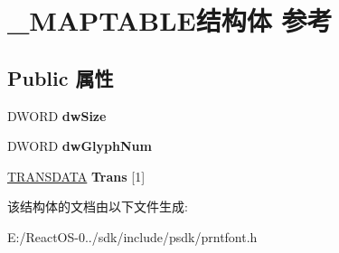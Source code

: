 \hypertarget{struct___m_a_p_t_a_b_l_e}{}\section{\+\_\+\+M\+A\+P\+T\+A\+B\+L\+E结构体 参考}
\label{struct___m_a_p_t_a_b_l_e}
\subsection*{Public 属性}
\begin{DoxyCompactItemize}
\item 
\mbox{\label{struct___m_a_p_t_a_b_l_e_a0964ee641949a1761675ea317d9630f9}} 
D\+W\+O\+RD {\bfseries dw\+Size}
\item 
\mbox{\label{struct___m_a_p_t_a_b_l_e_aeca813fa2257612330e66f1aeddbe885}} 
D\+W\+O\+RD {\bfseries dw\+Glyph\+Num}
\item 
\mbox{\label{struct___m_a_p_t_a_b_l_e_a20cc6dc8ffdf95a02f0111a69f088ad1}} 
\hyperlink{struct___t_r_a_n_s_d_a_t_a}{T\+R\+A\+N\+S\+D\+A\+TA} {\bfseries Trans} \mbox{[}1\mbox{]}
\end{DoxyCompactItemize}


该结构体的文档由以下文件生成\+:\begin{DoxyCompactItemize}
\item 
E\+:/\+React\+O\+S-\/0../sdk/include/psdk/prntfont.\+h\end{DoxyCompactItemize}
